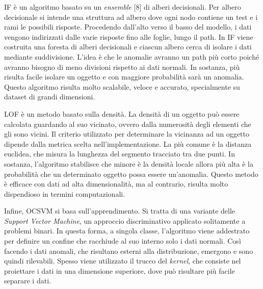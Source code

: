 IF è un algoritmo basato su un \textit{ensemble} [8] di alberi decisionali. Per albero decisionale si
intende una struttura ad albero dove ogni nodo contiene un test e i rami le possibili risposte.
Procedendo dall’alto verso il basso del modello, i dati vengono indirizzati dalle varie risposte
fino alle foglie, lungo il path. In IF viene costruita una foresta di alberi decisionali e ciascun
albero cerca di isolare i dati mediante suddivisione. L’idea è che le anomalie avranno un path
più corto poiché avranno bisogno di meno divisioni rispetto ai dati normali. In sostanza, più
risulta facile isolare un oggetto e con maggiore probabilità sarà un anomalia. Questo
algoritmo risulta molto scalabile, veloce e accurato, specialmente su dataset di grandi
dimensioni.

LOF è un metodo basato sulla densità. La densità di un oggetto può essere calcolata
guardando al suo vicinato, ovvero dalla numerosità degli elementi che gli sono vicini. Il
criterio utilizzato per determinare la vicinanza ad un oggetto dipende dalla metrica scelta
nell’implementazione. La più comune è la distanza euclidea, che misura la lunghezza del
segmento tracciato tra due punti. In sostanza, l’algoritmo stabilisce che minore è la densità
locale allora più alta è la probabilità che un determinato oggetto possa essere un’anomalia.
Questo metodo è efficace con dati ad alta dimensionalità, ma al contrario, risulta molto
dispendioso in termini computazionali.

Infine, OCSVM si basa sull’apprendimento. Si tratta di una variante delle \textit{Support Vector Machine}, un approccio discriminativo applicato solitamente a problemi binari. In questa
forma, a singola classe, l’algoritmo viene addestrato per definire un confine che racchiude al
suo interno solo i dati normali. Così facendo i dati anomali, che risultano esterni alla
distribuzione, emergono e sono quindi rilevabili. Spesso viene utilizzato il trucco del \textit{kernel},
che consiste nel proiettare i dati in una dimensione superiore, dove può risultare più facile
separare i dati.